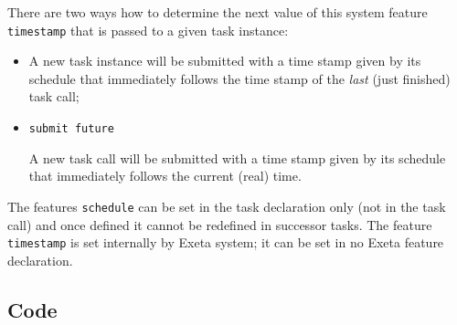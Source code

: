\documentclass[a4paper,12pt,english,oneside]{book}
\newcommand{\exeta}{Exeta\xspace}
\begin{document}
There are two ways how to determine the next value of this system feature \verb|timestamp| that is passed to a given task instance:
\begin{itemize} %
    \item {}
    
    A new task instance will be submitted with a time stamp given by its schedule that immediately follows the time stamp of the \emph{last} (just finished) task call;
    \item \texttt{submit future}
    
    A new task call will be submitted with a time stamp given by its schedule that immediately follows the current (real) time.
\end{itemize}
The features \verb|schedule| can be set in the task declaration only (not in the task call) and once defined it cannot be redefined in successor tasks. %
The feature \verb|timestamp| is set internally by \exeta system; it can be set in no \exeta feature declaration.
%
%
%

\subsection{Code}
\end{document}

